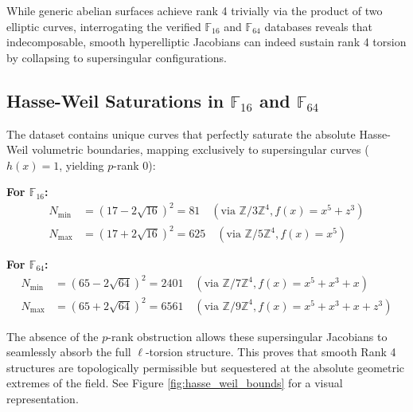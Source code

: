 \documentclass[letterpaper, 11pt]{article}
\begin{document}
While generic abelian surfaces achieve rank 4 trivially via the product of two elliptic curves, interrogating the verified $\mathbb{F}_{16}$ and $\mathbb{F}_{64}$ databases reveals that indecomposable, smooth hyperelliptic Jacobians can indeed sustain rank 4 torsion by collapsing to supersingular configurations. 

\subsection{Hasse-Weil Saturations in \texorpdfstring{$\mathbb{F}_{16}$}{F\_16} and \texorpdfstring{$\mathbb{F}_{64}$}{F\_64}}
The dataset contains unique curves that perfectly saturate the absolute Hasse-Weil volumetric boundaries, mapping exclusively to supersingular curves ($h(x) = 1$, yielding $p$-rank 0):

\textbf{For $\mathbb{F}_{16}$:}
\begin{align*}
    N_{\text{min}} &= (17 - 2\sqrt{16})^2 = 81 \quad (\text{via } \mathbb{Z}/3\mathbb{Z}^4, f(x) = x^5 + z^3) \\
    N_{\text{max}} &= (17 + 2\sqrt{16})^2 = 625 \quad (\text{via } \mathbb{Z}/5\mathbb{Z}^4, f(x) = x^5)
\end{align*}

\textbf{For $\mathbb{F}_{64}$:}
\begin{align*}
    N_{\text{min}} &= (65 - 2\sqrt{64})^2 = 2401 \quad (\text{via } \mathbb{Z}/7\mathbb{Z}^4, f(x) = x^5 + x^3 + x) \\
    N_{\text{max}} &= (65 + 2\sqrt{64})^2 = 6561 \quad (\text{via } \mathbb{Z}/9\mathbb{Z}^4, f(x) = x^5 + x^3 + x + z^3)
\end{align*}

The absence of the $p$-rank obstruction allows these supersingular Jacobians to seamlessly absorb the full $\ell$-torsion structure. This proves that smooth Rank 4 structures are topologically permissible but sequestered at the absolute geometric extremes of the field. See Figure \ref{fig:hasse_weil_bounds} for a visual representation.
\end{document}
